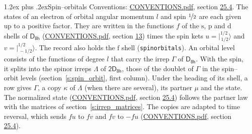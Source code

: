 \documentclass[10pt,a4paper]{article}
\makeatletter
\renewcommand\section{\@startsection{section}{1}{\z@}{-3ex plus -1ex minus -.2ex}%
  {1.2ex plus .2ex}{\normalfont\large\sffamily\bfseries\color{parttitle}}}
\numberwithin{equation}{section}
\newcommand{\grp}[1]{\mathsf{#1}}
\newcommand{\orbital}[1]{\mathrm{#1}}
\newcommand{\mult}{\kappa}
\newcommand{\intx}{\mu}
\newcommand{\jm}[2]{\bigl\lvert{}^{#1}_{\,#2}\bigr\rangle}
\makeatother
\begin{document}
\section{Spin--orbitals}\label{s:spin_orbitals}
Conventions: \href{../../CONVENTIONS.pdf}{CONVENTIONS.pdf}, section \href{../../CONVENTIONS.pdf\#conv.25.4}{25.4}.
\leavevmode\label{n:index.orbital.l}The states of an electron of orbital angular momentum $l$ and spin $\nicefrac{1}{2}$ are each given up to a positive factor. \label{n:local.spinor.uv}\label{n:local.function.f}They are written in the functions $f$ of the $\orbital{s}$, $\orbital{p}$ and $\orbital{d}$ shells of \href{../../../rotation/data/pdf/D8h.pdf}{$\grp{D_{8h}}$} (\href{../../CONVENTIONS.pdf}{CONVENTIONS.pdf}, section \href{../../../rotation/CONVENTIONS.pdf\#conv.13}{13}) times the spin kets $u = \jm{1/2}{1/2}$ and $v = \jm{1/2}{-1/2}$. The record also holds the $\orbital{f}$ shell (\texttt{spinorbitals}). An orbital level consists of the functions of degree $l$ that carry the irrep $\Gamma$ of \href{../../../rotation/data/pdf/D8h.pdf}{$\grp{D_{8h}}$}. With the spin, it splits into the spinor irreps $\Lambda$ of $\grp{2D_{8h}}$, those of the doublet of $\Gamma$ in the spin--orbit levels (section~\ref{s:spin_orbit}, first column). \label{n:head.state}Under the heading of its shell, a row gives $\Gamma$, a copy $\mult$ of $\Lambda$ (when there are several), its partner $\intx$ and the state. The normalized state (\href{../../CONVENTIONS.pdf}{CONVENTIONS.pdf}, section \href{../../CONVENTIONS.pdf\#conv.25.4}{25.4}) follows the partner law with the matrices of section~\ref{s:irrep_matrices}. The copies are adapted to time reversal, which sends $f u$ to $f v$ and $f v$ to $-f u$ (\href{../../CONVENTIONS.pdf}{CONVENTIONS.pdf}, section \href{../../CONVENTIONS.pdf\#conv.25.4}{25.4}).
\end{document}
